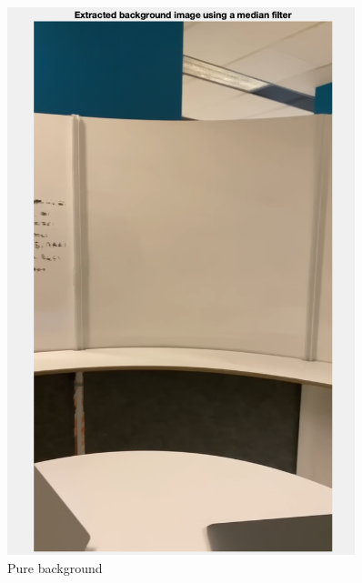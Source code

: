 \documentclass[12pt]{article}
\begin{document}
\begin{figure}[h]
    \centering
    \begin{minipage}{0.5\textwidth}
        \centering
        \includegraphics[width=0.9\textwidth]{figures/purebackground1.png}
        \caption{Pure background}
    \end{minipage}\hfill
    \begin{minipage}{0.45\textwidth}
        \centering

\end{minipage}
\end{figure}
\end{document}
